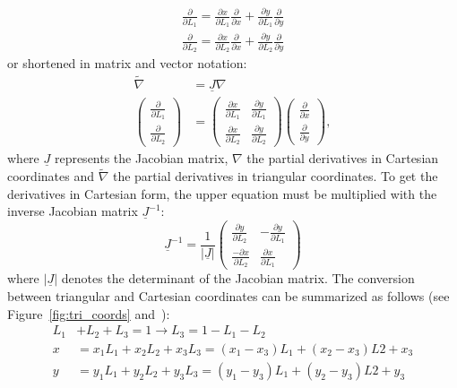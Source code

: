   \begin{align}
  \frac{\partial}{\partial L_1} = \frac{\partial x}{\partial L_1} \frac{\partial}{\partial x} + \frac{\partial y}{\partial L_1} \frac{\partial}{\partial y} \nonumber\\
  \frac{\partial}{\partial L_2} = \frac{\partial x}{\partial L_2} \frac{\partial}{\partial x} + \frac{\partial y}{\partial L_2} \frac{\partial}{\partial y}
  \end{align}
  or shortened in matrix and vector notation:
  \begin{align}\label{eq:t3NablaTilde}
  \tilde{\nabla} &= \underline{J} \nabla \nonumber\\
  \begin{pmatrix}
  \frac{\partial}{\partial L_1}\\ \frac{\partial}{\partial L_2}
  \end{pmatrix} &= \begin{pmatrix}
  \frac{\partial x}{\partial L_1} & \frac{\partial y}{\partial L_1}\\
  \frac{\partial x}{\partial L_2} & \frac{\partial y}{\partial L_2}
  \end{pmatrix} \begin{pmatrix}
  \frac{\partial}{\partial x}\\ \frac{\partial}{\partial y}
  \end{pmatrix},
  \end{align}
  where $\underline{J}$ represents the Jacobian matrix, $\nabla$ the partial derivatives in Cartesian coordinates and $\tilde{\nabla}$ the partial derivatives in triangular coordinates. To get the derivatives in Cartesian form, the upper equation must be multiplied with the inverse Jacobian matrix $\underline{J}^{-1}$:
  \begin{equation}
  \underline{J}^{-1} = \frac{1}{|\underline{J}|} \begin{pmatrix}
  \frac{\partial y}{\partial L_2} & -\frac{\partial y}{\partial L_1} \\
  \frac{-\partial x}{\partial L_2} & \frac{\partial x}{\partial L_1}
  \end{pmatrix}
  \end{equation}
  where $|\underline{J}|$ denotes the determinant of the Jacobian matrix. The conversion between triangular and Cartesian coordinates can be summarized as follows (see Figure~\ref{fig:tri_coords} and~\cite{steinke2005finite}):
  \begin{align}\label{eq:triCoord<->CartCoord}
  L_1 &+ L_2 + L_3 = 1 \rightarrow L_3 = 1-L_1-L_2 \nonumber\\
  x &= x_1L_1 + x_2L_2 + x_3L_3 = (x_1-x_3)L_1 + (x_2-x_3)L2 + x_3\\
  y &= y_1L_1 + y_2L_2 + y_3L_3 = (y_1-y_3)L_1 + (y_2-y_3)L2 + y_3 \nonumber
  \end{align}
